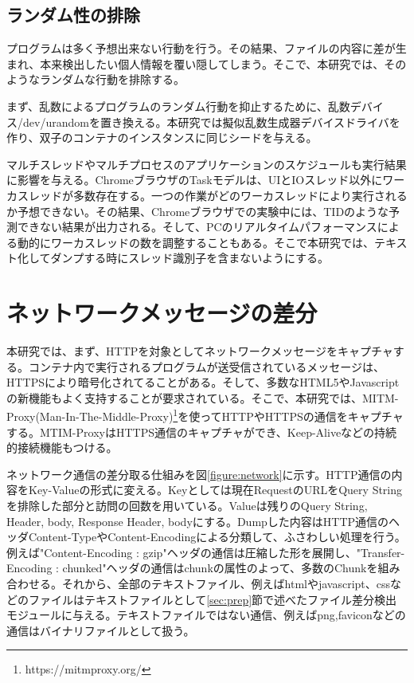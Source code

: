 \documentclass[a4paper,twocolumn,10pt]{jarticle}
\begin{document}
\subsection{ランダム性の排除}

プログラムは多く予想出来ない行動を行う。その結果、ファイルの内容に差が生まれ、本来検出したい個人情報を覆い隠してしまう。そこで、本研究では、そのようなランダムな行動を排除する。

まず、乱数によるプログラムのランダム行動を抑止するために、乱数デバイス/dev/urandomを置き換える。本研究では擬似乱数生成器デバイスドライバを作り、双子のコンテナのインスタンスに同じシードを与える。

マルチスレッドやマルチプロセスのアプリケーションのスケジュールも実行結果に影響を与える。ChromeブラウザのTaskモデルは、UIとIOスレッド以外にワーカスレッドが多数存在する。一つの作業がどのワーカスレッドにより実行されるか予想できない。その結果、Chromeブラウザでの実験中には、TIDのような予測できない結果が出力される。そして、PCのリアルタイムパフォーマンスによる動的にワーカスレッドの数を調整することもある\cite{dynamic}。そこで本研究では、テキスト化してダンプする時にスレッド識別子を含まないようにする。

\section{ネットワークメッセージの差分}
\label{sec:net}
本研究では、まず、HTTPを対象としてネットワークメッセージをキャプチャする。コンテナ内で実行されるプログラムが送受信されているメッセージは、HTTPSにより暗号化されてることがある。そして、多数なHTML5やJavascriptの新機能もよく支持することが要求されている。そこで、本研究では、MITM-Proxy(Man-In-The-Middle-Proxy)\footnote{https://mitmproxy.org/}を使ってHTTPやHTTPSの通信をキャプチャする。MTIM-ProxyはHTTPS通信のキャプチャができ、Keep-Aliveなどの持続的接続機能もつける。

ネットワーク通信の差分取る仕組みを図\ref{figure:network}に示す。HTTP通信の内容をKey-Valueの形式に変える。Keyとしては現在RequestのURLをQuery Stringを排除した部分と訪問の回数を用いている。Valueは残りのQuery String, Header, body, Response Header, bodyにする。Dumpした内容はHTTP通信のヘッダContent-TypeやContent-Encodingによる分類して、ふさわしい処理を行う。例えば"Content-Encoding : gzip"ヘッダの通信は圧縮した形を展開し、"Transfer-Encoding : chunked"ヘッダの通信はchunkの属性のよって、多数のChunkを組み合わせる。それから、全部のテキストファイル、例えばhtmlやjavascript、cssなどのファイルはテキストファイルとして\ref{sec:prep}節で述べたファイル差分検出モジュールに与える。テキストファイルではない通信、例えばpng,faviconなどの通信はバイナリファイルとして扱う。
\end{document}
